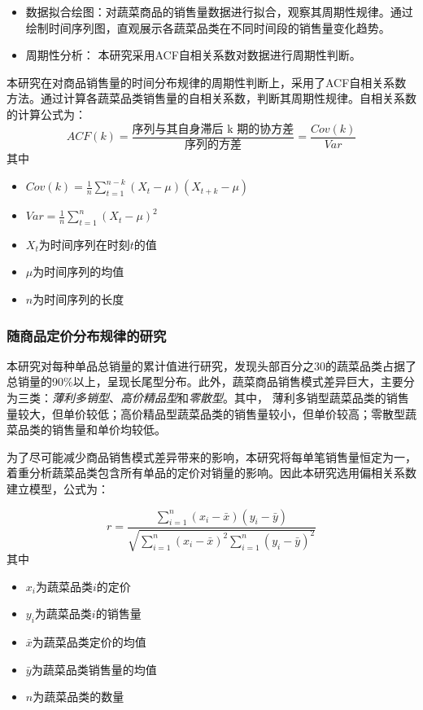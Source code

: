 \documentclass{article}
\begin{document}
\begin{itemize}
    \item 数据拟合绘图：对蔬菜商品的销售量数据进行拟合，观察其周期性规律。通过绘制时间序列图，直观展示各蔬菜品类在不同时间段的销售量变化趋势。
    \item 周期性分析： 本研究采用ACF自相关系数对数据进行周期性判断。
\end{itemize}

本研究在对商品销售量的时间分布规律的周期性判断上，采用了ACF自相关系数方法。通过计算各蔬菜品类销售量的自相关系数，判断其周期性规律。自相关系数的计算公式为：
\[ACF(k) = \frac{\text{序列与其自身滞后 k 期的协方差}}{\text{序列的方差}} = \frac{Cov(k)}{Var}\]
其中\begin{itemize}
    \item $Cov(k) = \frac{1}{n} \sum_{t=1}^{n-k} (X_t - \mu)(X_{t+k} - \mu)$
    \item $Var = \frac{1}{n} \sum_{t=1}^{n} (X_t - \mu)^2$
    \item $X_t$为时间序列在时刻$t$的值
    \item $\mu$为时间序列的均值
    \item $n$为时间序列的长度
\end{itemize}

\subsubsection{随商品定价分布规律的研究}
本研究对每种单品总销量的累计值进行研究，发现头部百分之30的蔬菜品类占据了总销量的90\%以上，呈现长尾型分布。此外，蔬菜商品销售模式差异巨大，主要分为三类：\textit{薄利多销型}、\textit{高价精品型}和\textit{零散型}。其中，
薄利多销型蔬菜品类的销售量较大，但单价较低；高价精品型蔬菜品类的销售量较小，但单价较高；零散型蔬菜品类的销售量和单价均较低。

为了尽可能减少商品销售模式差异带来的影响，本研究将每单笔销售量恒定为一，着重分析蔬菜品类包含所有单品的定价对销量的影响。因此本研究选用偏相关系数建立模型，公式为：

\[
r = \frac{
    \sum_{i=1}^{n} (x_i - \bar{x})(y_i - \bar{y})
}{
    \sqrt{
        \sum_{i=1}^{n} (x_i - \bar{x})^2
        \sum_{i=1}^{n} (y_i - \bar{y})^2
    }
}
\]
其中
\begin{itemize}
    \item $x_i$为蔬菜品类$i$的定价
    \item $y_i$为蔬菜品类$i$的销售量
    \item $\bar{x}$为蔬菜品类定价的均值
    \item $\bar{y}$为蔬菜品类销售量的均值
    \item $n$为蔬菜品类的数量
\end{itemize}
\end{document}
